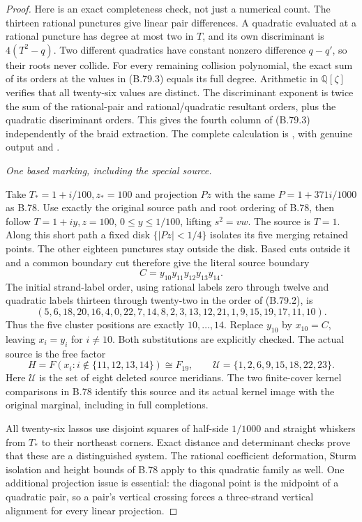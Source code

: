 \begin{proof}
Here is an exact completeness check, not just a numerical count.
The thirteen rational punctures give linear pair differences. A
quadratic evaluated at a rational puncture has degree at most two in
\(T\), and its own discriminant is \(4(T^2-q)\). Two different
quadratics have constant nonzero difference \(q-q'\), so their roots
never collide. For every remaining collision polynomial, the exact
sum of its orders at the values in (B.79.3) equals its full degree.
Arithmetic in \(\mathbb Q[\zeta]\) verifies that all twenty-six
values are distinct. The discriminant exponent is twice the sum of
the rational-pair and rational/quadratic resultant orders, plus the
quadratic discriminant orders. This gives the fourth column of
(B.79.3) independently of the braid extraction. The complete calculation
is , with genuine
output and .

\emph{One based marking, including the special source.}\par
Take \(T_*=1+i/100,z_*=100\) and projection \(Pz\) with the same
\(P=1+371i/1000\) as B.78. Use exactly the original source path and
root ordering of B.78, then follow \(T=1+iy,z=100\),
\(0\leq y\leq1/100\), lifting \(s^2=vw\). The source is \(T=1\).
Along this short path a fixed disk \(\{|Pz|<1/4\}\) isolates its
five merging retained points. The other eighteen punctures stay outside
the disk. Based cuts outside it and a common boundary cut therefore
give the literal source boundary
\[
               C=y_{10}y_{11}y_{12}y_{13}y_{14}.
 \tag{B.79.4}
\]
The initial strand-label order, using rational labels zero through
twelve and quadratic labels thirteen through twenty-two in the order
of (B.79.2), is
\[
 (5,6,18,20,16,4,0,22,7,14,8,2,3,13,12,21,1,9,15,19,17,11,10).
 \tag{B.79.5}
\]
Thus the five cluster positions are exactly \(10,\ldots,14\).
Replace \(y_{10}\) by \(x_{10}=C\), leaving \(x_i=y_i\) for
\(i\ne10\). Both substitutions are explicitly checked. The actual
source is the free factor
\[
 H=F(x_i:i\notin\{11,12,13,14\})\cong F_{19},
 \qquad \mathcal U=\{1,2,6,9,15,18,22,23\}.
 \tag{B.79.6}
\]
Here \(\mathcal U\) is the set of eight deleted source meridians.
The two finite-cover kernel comparisons in B.78 identify this source
and its actual kernel image with the original marginal, including in
full completions.

All twenty-six lassos use disjoint squares of half-side \(1/1000\)
and straight whiskers from \(T_*\) to their northeast corners. Exact
distance and determinant checks prove that these are a distinguished
system. The rational coefficient deformation, Sturm isolation and
height bounds of B.78 apply to this quadratic family as well. One
additional projection issue is essential: the diagonal point is the
midpoint of a quadratic pair, so a pair's vertical crossing forces
a three-strand vertical alignment for every linear projection.


\end{proof}
